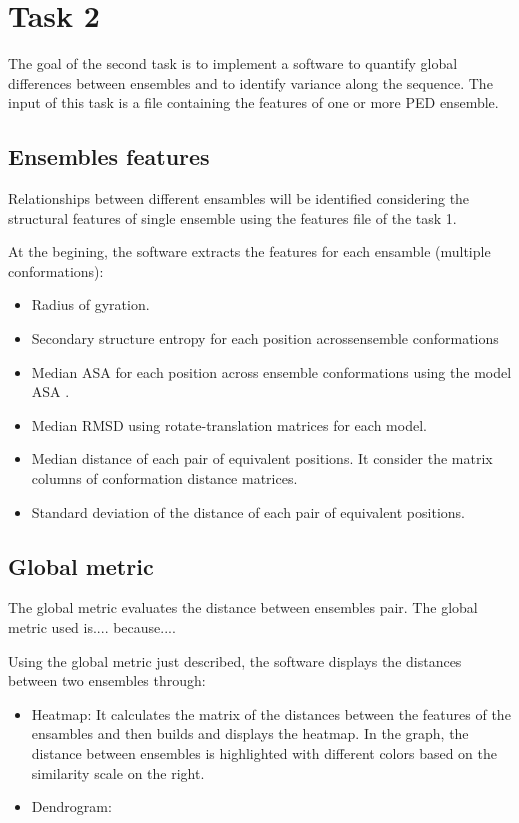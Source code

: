 \section{Task 2}\label{sec:task2}

The goal of the second task is to implement a software to quantify global differences between ensembles and to identify variance along the sequence. The input of this task is a file containing the features of one or more PED ensemble.

\subsection{Ensembles features}
Relationships between different ensambles will be identified considering the structural features of single ensemble using the features file of the task 1.

At the begining, the software extracts the features for each ensamble (multiple conformations):
\begin{itemize}
\item Radius of gyration.
\item Secondary structure entropy for each position acrossensemble conformations
\item Median ASA for each position across ensemble conformations using the model ASA .
\item Median RMSD using rotate-translation matrices for each model.
\item Median distance of each pair of equivalent positions. It consider the matrix columns of conformation distance matrices.
\item Standard deviation of the distance of each pair of equivalent positions.
\end{itemize}


\subsection{Global metric}
The global metric evaluates the distance between ensembles pair. 
The global metric used is.... because....

Using the global metric just described, the software displays the distances between two ensembles through:
\begin{itemize}
\item Heatmap: It calculates the matrix of the distances between the features of the ensambles and then builds and displays the heatmap. In the graph, the distance between ensembles is highlighted with different colors based on the similarity scale on the right. 
\item Dendrogram:
\end{itemize}

